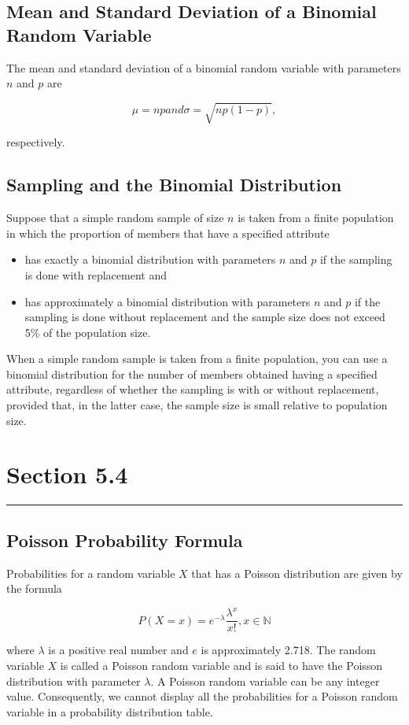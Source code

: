\documentclass[12pt]{article}
\begin{document}
        \subsection*{Mean and Standard Deviation of a Binomial Random Variable}
            The mean and standard deviation of a binomial random variable with parameters $n$ and $p$ are
            \begin{center}
                \[
                    \mu = np and \sigma = \sqrt{np(1-p)},    
                \]                
            \end{center}
            respectively.
        \subsection*{Sampling and the Binomial Distribution}
            Suppose that a simple random sample of size $n$ is taken from a finite population in which the
            proportion of members that have a specified attribute
            \begin{itemize}
                \item has exactly a binomial distribution with parameters $n$ and $p$ if the sampling is
                done with replacement and
                \item has approximately a binomial distribution with parameters $n$ and $p$ if the
                sampling is done without replacement and the sample size does not exceed 5\% of the
                population size.
            \end{itemize}
            When a simple random sample is taken from a finite population, you can use a binomial
            distribution for the number of members obtained having a specified attribute,
            regardless of whether the sampling is with or without replacement, provided that, in the
            latter case, the sample size is small relative to population size.
    \section*{Section 5.4}
    \noindent\rule{\textwidth}{0.4pt}
        \subsection*{Poisson Probability Formula}
            Probabilities for a random variable $X$ that has a Poisson distribution are given by the
            formula
            \begin{center}
                \[
                    P(X = x) = e^{-\lambda}\frac{\lambda^x}{x!},    x \in \mathbb{N}    
                \]                    
            \end{center}
            where $\lambda$ is a positive real number and $e$ is approximately 2.718. The random
            variable $X$ is called a Poisson random variable and is said to have the Poisson distribution
            with parameter $\lambda$.
            A Poisson random variable can be any integer value. Consequently, we cannot display all the
            probabilities for a Poisson random variable in a probability distribution table.
\end{document}
